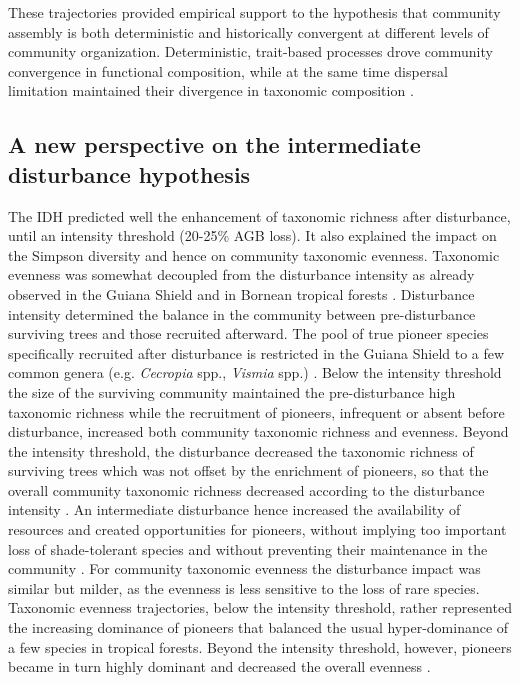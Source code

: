 \documentclass[fleqn,10pt]{ArtEcoFoG} %
\begin{document}
These trajectories provided empirical support to the hypothesis that
community assembly is both deterministic and historically convergent at
different levels of community organization. Deterministic, trait-based
processes drove community convergence in functional composition, while
at the same time dispersal limitation maintained their divergence in
taxonomic composition \citep{Fukami2005}.

\subsection{A new perspective on the intermediate disturbance
hypothesis}\label{a-new-perspective-on-the-intermediate-disturbance-hypothesis}

The IDH predicted well the enhancement of taxonomic richness after
disturbance, until an intensity threshold (20-25\% AGB loss). It also
explained the impact on the Simpson diversity and hence on community
taxonomic evenness. Taxonomic evenness was somewhat decoupled from the
disturbance intensity as already observed in the Guiana Shield
\citep{Baraloto2012a} and in Bornean tropical forests
\citep{Cannon1998}. Disturbance intensity determined the balance in the
community between pre-disturbance surviving trees and those recruited
afterward. The pool of true pioneer species specifically recruited after
disturbance is restricted in the Guiana Shield to a few common genera
(e.g. \emph{Cecropia} spp., \emph{Vismia} spp.) \citep{Guitet2018}.
Below the intensity threshold the size of the surviving community
maintained the pre-disturbance high taxonomic richness while the
recruitment of pioneers, infrequent or absent before disturbance,
increased both community taxonomic richness and evenness. Beyond the
intensity threshold, the disturbance decreased the taxonomic richness of
surviving trees which was not offset by the enrichment of pioneers, so
that the overall community taxonomic richness decreased according to the
disturbance intensity \citep{Molino2001}. An intermediate disturbance
hence increased the availability of resources and created opportunities
for pioneers, without implying too important loss of shade-tolerant
species and without preventing their maintenance in the community
\citep{Bongers2009}. For community taxonomic evenness the disturbance
impact was similar but milder, as the evenness is less sensitive to the
loss of rare species. Taxonomic evenness trajectories, below the
intensity threshold, rather represented the increasing dominance of
pioneers that balanced the usual hyper-dominance of a few species in
tropical forests. Beyond the intensity threshold, however, pioneers
became in turn highly dominant and decreased the overall evenness
\citep{Baraloto2012a}.
\end{document}
